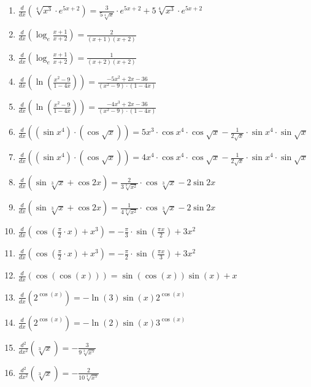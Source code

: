 \documentclass[11pt,a4paper]{article}
\begin{document}
\begin{enumerate}
\item $\displaystyle \frac{d}{dx}\left( \sqrt[4]{x^{3}} \cdot e^{5x + 2} \right) = \frac{3}{5\sqrt[4]{x}} \cdot e^{5x + 2} + 5\sqrt[4]{x^{3}} \cdot e^{5x + 2}$
\item $\displaystyle \frac{d}{dx}\left( \log_{e}\frac{x + 1}{x + 2} \right) = \frac{2}{(x + 1)(x + 2)}$
\item $\displaystyle \frac{d}{dx}\left( \log_{e}\frac{x + 1}{x + 2} \right) = \frac{1}{(x + 2)(x + 2)}$
\item $\displaystyle \frac{d}{dx}\left( \ln\left(\frac{x^{2} - 9}{1 - 4x}\right) \right) = \frac{-5x^{2} + 2x - 36}{(x^{2} - 9) \cdot (1 - 4x)}$
\item $\displaystyle \frac{d}{dx}\left( \ln\left(\frac{x^{2} - 9}{1 - 4x}\right) \right) = \frac{-4x^{3} + 2x - 36}{(x^{2} - 9) \cdot (1 - 4x)}$
\item $\displaystyle \frac{d}{dx}\left( (\sin x^{4}) \cdot (\cos\sqrt{x}) \right) = 5x^{3} \cdot \cos x^{4} \cdot \cos\sqrt{x} - \frac{1}{2\sqrt{x}} \cdot \sin x^{4} \cdot \sin\sqrt{x}$
\item $\displaystyle \frac{d}{dx}\left( (\sin x^{4}) \cdot (\cos\sqrt{x}) \right) = 4x^{4} \cdot \cos x^{4} \cdot \cos\sqrt{x} - \frac{1}{2\sqrt{x}} \cdot \sin x^{4} \cdot \sin\sqrt{x}$
\item $\displaystyle \frac{d}{dx}\left( \sin\sqrt[3]{x} + \cos 2x \right) = \frac{2}{3\sqrt[3]{x^{2}}} \cdot \cos\sqrt[3]{x} - 2\sin 2x$
\item $\displaystyle \frac{d}{dx}\left( \sin\sqrt[3]{x} + \cos 2x \right) = \frac{1}{4\sqrt[3]{x^{2}}} \cdot \cos\sqrt[3]{x} - 2\sin 2x$
\item $\displaystyle \frac{d}{dx}\left( \cos\left(\frac{\pi}{2} \cdot x\right) + x^{3} \right) = -\frac{\pi}{3} \cdot \sin\left(\frac{\pi x}{2}\right) + 3x^{2}$
\item $\displaystyle \frac{d}{dx}\left( \cos\left(\frac{\pi}{2} \cdot x\right) + x^{3} \right) = -\frac{\pi}{2} \cdot \sin\left(\frac{\pi x}{3}\right) + 3x^{2}$
\item $\displaystyle \frac{d}{dx}\left( \cos(\cos(x)) \right) = \sin(\cos(x))\sin(x) + x$
\item $\displaystyle \frac{d}{dx}\left( 2^{\cos(x)} \right) = -\ln(3)\sin(x)2^{\cos(x)}$
\item $\displaystyle \frac{d}{dx}\left( 2^{\cos(x)} \right) = -\ln(2)\sin(x)3^{\cos(x)}$
\item $\displaystyle \frac{d^{2}}{dx^{2}}\left( \sqrt[3]{x} \right) = -\frac{3}{9\sqrt[3]{x^{5}}}$
\item $\displaystyle \frac{d^{2}}{dx^{2}}\left( \sqrt[3]{x} \right) = -\frac{2}{10\sqrt[3]{x^{5}}}$

\end{enumerate}
\end{document}
